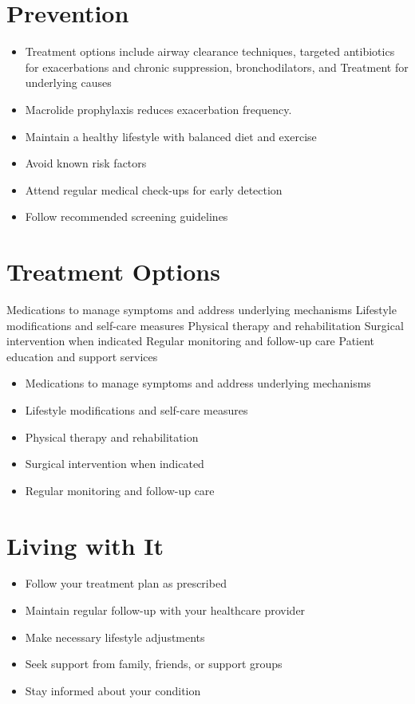 \section{Prevention}
\begin{itemize}[noitemsep]
  \item Treatment options include airway clearance techniques, targeted antibiotics for exacerbations and chronic suppression, bronchodilators, and Treatment for underlying causes
  \item Macrolide prophylaxis reduces exacerbation frequency.
  \item Maintain a healthy lifestyle with balanced diet and exercise
  \item Avoid known risk factors
  \item Attend regular medical check-ups for early detection
  \item Follow recommended screening guidelines
\end{itemize}
\section{Treatment Options}
Medications to manage symptoms and address underlying mechanisms Lifestyle modifications and self-care measures Physical therapy and rehabilitation Surgical intervention when indicated Regular monitoring and follow-up care Patient education and support services

\begin{itemize}[noitemsep]
  \item Medications to manage symptoms and address underlying mechanisms
  \item Lifestyle modifications and self-care measures
  \item Physical therapy and rehabilitation
  \item Surgical intervention when indicated
  \item Regular monitoring and follow-up care
\end{itemize}
\section{Living with It}
\begin{itemize}[noitemsep]
  \item Follow your treatment plan as prescribed
  \item Maintain regular follow-up with your healthcare provider
  \item Make necessary lifestyle adjustments
  \item Seek support from family, friends, or support groups
  \item Stay informed about your condition
\end{itemize}

